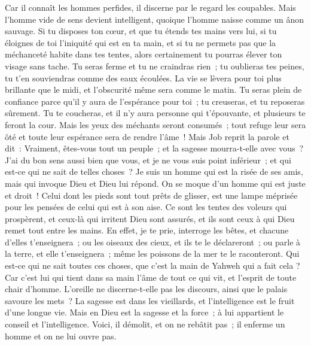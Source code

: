 \begin{multicols}{2}
Car il connaît les hommes perfides, il discerne par le regard les coupables.
Mais l'homme vide de sens devient intelligent, quoique l'homme naisse comme un ânon sauvage.
Si tu disposes ton cœur, et que tu étends tes mains vers lui,
si tu éloignes de toi l'iniquité qui est en ta main, et si tu ne permets pas que la méchanceté habite dans tes tentes,
alors certainement tu pourras élever ton visage sans tache. Tu seras ferme et tu ne craindras rien~;
tu oublieras tes peines, tu t'en souviendras comme des eaux écoulées.
La vie se lèvera pour toi plus brillante que le midi, et l'obscurité même sera comme le matin.
 Tu seras plein de confiance parce qu'il y aura de l'espérance pour toi~; tu creuseras, et tu reposeras sûrement.
Tu te coucheras, et il n'y aura personne qui t'épouvante, et plusieurs te feront la cour.
Mais les yeux des méchants seront consumés~; tout refuge leur sera ôté et toute leur espérance sera de rendre l'âme~!
\VerseOne{}Mais Job reprit la parole et dit~:
Vraiment, êtes-vous tout un peuple~; et la sagesse mourra-t-elle avec vous~?
J'ai du bon sens aussi bien que vous, et je ne vous suis point inférieur~; et qui est-ce qui ne sait de telles choses~?
Je suis un homme qui est la risée de ses amis, mais qui invoque Dieu et Dieu lui répond. On se moque d'un homme qui est juste et droit~!
 Celui dont les pieds sont tout prêts de glisser, est une lampe méprisée pour les pensées de celui qui est à son aise.
Ce sont les tentes des voleurs qui prospèrent, et ceux-là qui irritent Dieu sont assurés, et ils sont ceux à qui Dieu remet tout entre les mains.
En effet, je te prie, interroge les bêtes, et chacune d'elles t'enseignera~; ou les oiseaux des cieux, et ils te le déclareront~;
ou parle à la terre, et elle t'enseignera~; même les poissons de la mer te le raconteront.
Qui est-ce qui ne sait toutes ces choses, que c'est la main de Yahweh qui a fait cela ?
Car c'est lui qui tient dans sa main l'âme de tout ce qui vit, et l'esprit de toute chair d'homme.
L'oreille ne discerne-t-elle pas les discours, ainsi que le palais savoure les mets~?
La sagesse est dans les vieillards, et l'intelligence est le fruit d'une longue vie.
Mais en Dieu est la sagesse et la force~; à lui appartient le conseil et l'intelligence.
Voici, il démolit, et on ne rebâtit pas~; il enferme un homme et on ne lui ouvre pas.

\end{multicols}
